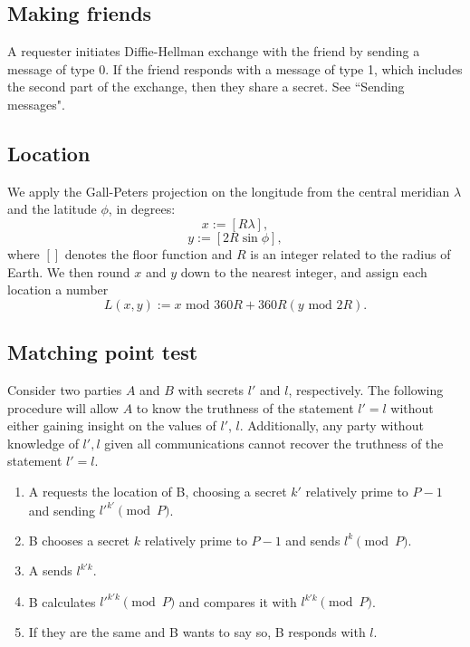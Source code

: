 \documentclass{article}
\begin{document}
\subsection{Making friends}
A requester initiates Diffie-Hellman exchange with the friend by sending a message of type 0. If the friend responds with a message of type 1, which includes the second part of the exchange, then they share a secret. See ``Sending messages".

\subsection{Location}
We apply the Gall-Peters projection on the longitude from the central meridian $\lambda$ and the latitude $\phi$, in degrees:
$$x:=[R\lambda],$$
$$y:=[2R \sin \phi],$$
where $[]$ denotes the floor function and $R$ is an integer related to the radius of Earth. We then round $x$ and $y$ down to the nearest integer, and assign each location a number
$$L(x,y):=x \text{ mod } 360R + 360R(y \text{ mod } 2R).$$

\subsection{Matching point test}
Consider two parties $A$ and $B$ with secrets $l'$ and $l$, respectively.
The following procedure will allow $A$ to know the truthness of the statement $l' = l$ without either gaining insight on the values of $l'$, $l$. Additionally, any party without knowledge of $l', l$ given all communications cannot recover the truthness of the statement $l' = l$.

\begin{enumerate}
    \item A requests the location of B, choosing a secret $k'$ relatively prime to $P-1$ and sending $l'^{k'} \pmod{P}$.
    \item B chooses a secret $k$ relatively prime to $P-1$ and sends $l^{k} \pmod{P}$.
    \item A sends $l^{k' k}$.
    \item B calculates $l'^{k' k} \pmod{P}$ and compares it with $l^{k' k} \pmod{P}$.
    \item If they are the same and B wants to say so, B responds with $l$.
\end{enumerate}
\end{document}
